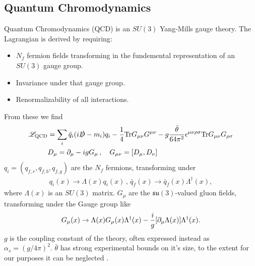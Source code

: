 \subsection{Quantum Chromodynamics}
\label{sec:qcd}

Quantum Chromodynamics (QCD) is an $SU(3)$ Yang-Mills gauge theory. The Lagrangian is derived by requiring:
\begin{itemize}
\item
  $N_f$ fermion fields transforming in the fundemental representation of  an $SU(3)$ gauge group.
\item
  Invariance under that gauge group.
\item
  Renormalizability of all interactions.
\end{itemize}
From these we find \cite{Schwartz:2013pla}
\begin{align}
  \mathscr{L}_{\text{QCD}} &= \sum_i \bar{q}_i (i \slashed{D} - m_i) q_i - {1\over 4} \text{Tr}G_{\mu\nu} G^{\mu\nu} - g{\bar{\theta}\over 64 \pi^2} \epsilon^{\mu\nu\rho\sigma} \text{Tr}G_{\mu\nu} G_{\rho\sigma} \\
  &D_{\mu} = \partial_{\mu} - i g G_{\mu} \,,\quad
  G_{\mu\nu} = [ D_{\mu}, D_{\nu} ]
  \nonumber
\end{align}
$q_i = ( q_{f,r}, q_{f,b}, q_{f,g} )$ are the $N_f$ fermions, transforming under
\begin{align}
  q_i(x) \to \Lambda(x)q_i(x) \,,\, \bar{q}_f(x) \to \bar{q}_f(x) \Lambda^{\dagger}(x),
  \label{eq:quark_gauge_trans}
\end{align}
where $\Lambda(x)$ is an $SU(3)$ matrix. $G_{\mu}$ are the $\mathfrak{su}(3)$-valued gluon fields, transforming under the Gauge group like
\begin{align}
  G_{\mu}(x) \to \Lambda(x) G_{\mu}(x) \Lambda^{\dagger}(x) - {i\over g} [ \partial_{\mu} \Lambda(x) ] \Lambda^{\dagger}(x).
  \label{eq:G_gauge_trans}
\end{align}
$g$ is the coupling constant of the theory, often expressed instead as $\alpha_s = (g/4\pi)^2$. $\bar{\theta}$ has strong experimental bounds on it's size, to the extent for our purposes it can be neglected \cite{ALTAREV1992242}.

